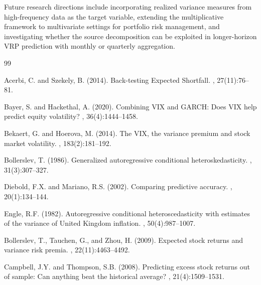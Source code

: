 \documentclass[12pt,a4paper]{article}
\begin{document}
Future research directions include incorporating realized variance measures from high-frequency data as the target variable, extending the multiplicative framework to multivariate settings for portfolio risk management, and investigating whether the source decomposition can be exploited in longer-horizon VRP prediction with monthly or quarterly aggregation.




\begin{thebibliography}{99}

Acerbi, C. and Szekely, B. (2014).
\newblock Back-testing Expected Shortfall.
, 27(11):76--81.

Bayer, S. and Hackethal, A. (2020).
\newblock Combining VIX and GARCH: Does VIX help predict equity volatility?
, 36(4):1444--1458.

Bekaert, G. and Hoerova, M. (2014).
\newblock The VIX, the variance premium and stock market volatility.
, 183(2):181--192.

Bollerslev, T. (1986).
\newblock Generalized autoregressive conditional heteroskedasticity.
, 31(3):307--327.

Diebold, F.X. and Mariano, R.S. (2002).
\newblock Comparing predictive accuracy.
, 20(1):134--144.

Engle, R.F. (1982).
\newblock Autoregressive conditional heteroscedasticity with estimates of the variance of United Kingdom inflation.
, 50(4):987--1007.

Bollerslev, T., Tauchen, G., and Zhou, H. (2009).
\newblock Expected stock returns and variance risk premia.
, 22(11):4463--4492.

Campbell, J.Y. and Thompson, S.B. (2008).
\newblock Predicting excess stock returns out of sample: Can anything beat the historical average?
, 21(4):1509--1531.


\end{thebibliography}
\end{document}
